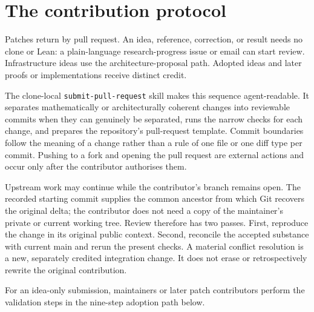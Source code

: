 \documentclass[10pt]{article}
\begin{document}
\section{The contribution protocol}\label{sec:protocol}

Patches return by pull request. An idea, reference, correction, or result needs
no clone or Lean: a plain-language research-progress issue or email can start
review. Infrastructure ideas use the architecture-proposal path. Adopted ideas
and later proofs or implementations receive distinct credit.

The clone-local \texttt{submit-pull-request} skill makes this sequence
agent-readable. It separates mathematically or architecturally coherent
changes into reviewable commits when they can genuinely be separated, runs the
narrow checks for each change, and prepares the repository's pull-request
template. Commit boundaries follow the meaning of a change rather than a rule
of one file or one diff type per commit. Pushing to a fork and opening the pull
request are external actions and occur only after the contributor authorises
them.

Upstream work may continue while the contributor's branch remains open. The
recorded starting commit supplies the common ancestor from which Git recovers
the original delta; the contributor does not need a copy of the maintainer's
private or current working tree. Review therefore has two passes. First,
reproduce the change in its original public context. Second, reconcile the
accepted substance with current main and rerun the present checks. A material
conflict resolution is a new, separately credited integration change. It does
not erase or retrospectively rewrite the original contribution.

For an idea-only submission, maintainers or later patch contributors perform
the validation steps in the nine-step adoption path below.
\end{document}
